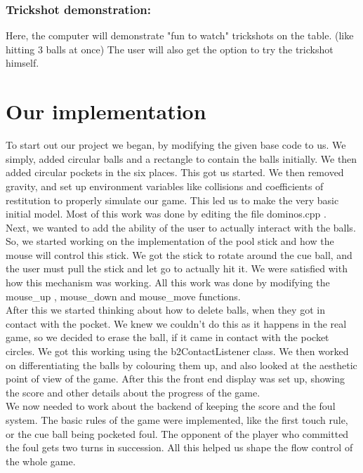 \documentclass[a4paper,12pt]{article}
\begin{document}
\subsubsection{Trickshot demonstration:}
Here, the computer will demonstrate "fun to watch" trickshots on the table. (like hitting 3 balls at once) The user will also get the option to try the trickshot himself.

\vspace{3cm}

\section{\cite{Documentation}Our implementation}

\cite{cocos2D}
To start out our project we began, by modifying the given base code to us. We simply, added circular balls and a rectangle to contain the balls initially. We then added circular pockets in the six places. This got us started. We then removed gravity, and set up environment variables like collisions and coefficients of restitution to properly simulate our game. This led us to make the very basic initial model.
Most of this work was done by editing the file dominos.cpp .\\

\cite{cocos2D}
Next, we wanted to add the ability of the user to actually interact with the balls. So, we started working on the implementation of the pool stick and how the mouse will control this stick. We got the stick to rotate around the cue ball, and the user must pull the stick and let go to actually hit it. We were satisfied with how this mechanism was working. All this work was done by modifying the mouse\_up , mouse\_down and mouse\_move functions.\\

\cite{b2ContactListener} \cite{iforce2D}
After this we started thinking about how to delete balls, when they got in contact with the pocket. We knew we couldn't do this as it happens in the real game, so we decided to erase the ball, if it came in contact with the pocket circles. We got this working using the b2ContactListener class. We then worked on differentiating the balls by colouring them up, and also looked at the aesthetic point of view of the game. After this the front end display was set up, showing the score and other details about the progress of the game.\\

We now needed to work about the backend of keeping the score and the foul system. The basic rules of the game were implemented, like the first touch rule, or the cue ball being pocketed foul. The opponent of the player who committed the foul gets two turns in succession. All this helped us shape the flow control of the whole game.\\
\end{document}
